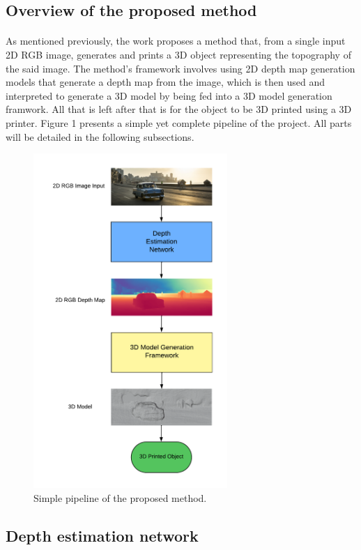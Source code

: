 \documentclass[12pt, letterpaper]{article}
\begin{document}
\begin{spacing}{1.15}
\subsection{Overview of the proposed method}
\paragraph{}
As mentioned previously, the work proposes a method that, from a single input 2D RGB image, generates and prints a 3D object representing the topography of the said image. The 
method's framework involves using 2D depth map generation models that generate a depth map from the image, which is then used and interpreted to generate a 3D model by being fed into
a 3D model generation framwork. All that is left after that is for the object to be 3D printed using a 3D printer. Figure 1 presents a simple yet complete pipeline of the project.
All parts will be detailed in the following subsections.

\begin{figure}[!ht]
    \centering
    \includegraphics[height = 12.7cm]{pipeline.pdf}
    \caption{Simple pipeline of the proposed method.}
\end{figure}

\subsection{Depth estimation network}

\end{spacing}
\end{document}
